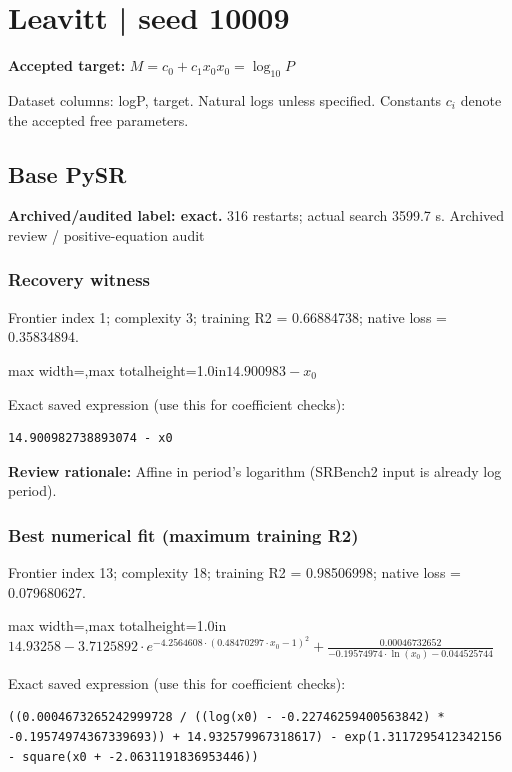 \documentclass[10pt,letterpaper,landscape]{article}
\begin{document}
\section*{Leavitt | seed 10009}
\textbf{Accepted target:} $\displaystyle M=c_0+c_1x_0$\hfill $x_0=\log_{10}P$\par
{\small Dataset columns: logP, target. Natural logs unless specified. Constants $c_i$ denote the accepted free parameters.}\par\medskip
\begin{minipage}[t]{0.485\textwidth}
\subsection*{Base PySR}
\textbf{Archived/audited label: exact.} 316 restarts; actual search 3599.7 s.
{\small Archived review / positive-equation audit}
\subsubsection*{Recovery witness}
Frontier index 1; complexity 3; training R2 = 0.66884738; native loss = 0.35834894.
\begin{center}\begin{adjustbox}{max width=\linewidth,max totalheight=1.0in}$\displaystyle 14.900983 - x_{0}$\end{adjustbox}\end{center}
{\scriptsize Exact saved expression (use this for coefficient checks):}
\begin{lstlisting}
14.900982738893074 - x0
\end{lstlisting}
{\small\textbf{Review rationale:} Affine in period's logarithm (SRBench2 input is already log period).}
\subsubsection*{Best numerical fit (maximum training R2)}
Frontier index 13; complexity 18; training R2 = 0.98506998; native loss = 0.079680627.
\begin{center}\begin{adjustbox}{max width=\linewidth,max totalheight=1.0in}$\displaystyle 14.93258 - 3.7125892 \cdot e^{- 4.2564608 \cdot \left(0.48470297 \cdot x_{0} - 1\right)^{2}} + \frac{0.00046732652}{- 0.19574974 \cdot \ln{\left(x_{0} \right)} - 0.044525744}$\end{adjustbox}\end{center}
{\scriptsize Exact saved expression (use this for coefficient checks):}
\begin{lstlisting}
((0.0004673265242999728 / ((log(x0) - -0.22746259400563842) * -0.19574974367339693)) + 14.932579967318617) - exp(1.3117295412342156 - square(x0 + -2.0631191836953446))
\end{lstlisting}
\end{minipage}\hfill
\end{document}
